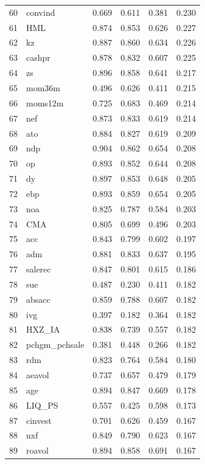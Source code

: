 \begin{footnotesize}
\begin{longtable}{rl|c|c|c|c}
		60 & convind & 0.669 & 0.611 & 0.381 & 0.230 \\ 
		61 & HML & 0.874 & 0.853 & 0.626 & 0.227 \\ 
		62 & kz & 0.887 & 0.860 & 0.634 & 0.226 \\ 
		63 & cashpr & 0.878 & 0.832 & 0.607 & 0.225 \\ 
		64 & zs & 0.896 & 0.858 & 0.641 & 0.217 \\ 
		65 & mom36m & 0.496 & 0.626 & 0.411 & 0.215 \\ 
		66 & moms12m & 0.725 & 0.683 & 0.469 & 0.214 \\ 
		67 & nef & 0.873 & 0.833 & 0.619 & 0.214 \\ 
		68 & ato & 0.884 & 0.827 & 0.619 & 0.209 \\ 
		69 & ndp & 0.904 & 0.862 & 0.654 & 0.208 \\ 
		70 & op & 0.893 & 0.852 & 0.644 & 0.208 \\ 
		71 & dy & 0.897 & 0.853 & 0.648 & 0.205 \\ 
		72 & ebp & 0.893 & 0.859 & 0.654 & 0.205 \\ 
		73 & noa & 0.825 & 0.787 & 0.584 & 0.203 \\ 
		74 & CMA & 0.805 & 0.699 & 0.496 & 0.203 \\ 
		75 & acc & 0.843 & 0.799 & 0.602 & 0.197 \\ 
		76 & adm & 0.881 & 0.833 & 0.637 & 0.195 \\ 
		77 & salerec & 0.847 & 0.801 & 0.615 & 0.186 \\ 
		78 & sue & 0.487 & 0.230 & 0.411 & 0.182 \\ 
		79 & absacc & 0.859 & 0.788 & 0.607 & 0.182 \\ 
		80 & ivg & 0.397 & 0.182 & 0.364 & 0.182 \\ 
		81 & HXZ\_IA & 0.838 & 0.739 & 0.557 & 0.182 \\ 
		82 & pchgm\_pchsale & 0.381 & 0.448 & 0.266 & 0.182 \\ 
		83 & rdm & 0.823 & 0.764 & 0.584 & 0.180 \\ 
		84 & aeavol & 0.737 & 0.657 & 0.479 & 0.179 \\ 
		85 & age & 0.894 & 0.847 & 0.669 & 0.178 \\ 
		86 & LIQ\_PS & 0.557 & 0.425 & 0.598 & 0.173 \\ 
		87 & cinvest & 0.701 & 0.626 & 0.459 & 0.167 \\ 
		88 & nxf & 0.849 & 0.790 & 0.623 & 0.167 \\ 
		89 & roavol & 0.894 & 0.858 & 0.691 & 0.167 \\ 

\end{longtable}
\end{footnotesize}
